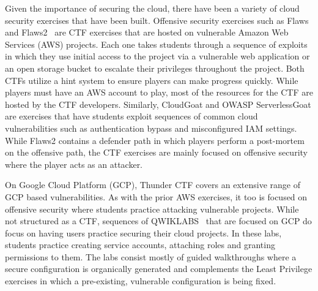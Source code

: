 Given the importance of securing the cloud, there have been a variety of cloud security exercises that have been built.
Offensive security exercises such as Flaws and Flaws2~\cite{flaws,flaws2} are CTF exercises that are hosted on vulnerable
Amazon Web Services (AWS) projects.  Each one takes students through a sequence of exploits in which they use initial access to the project
via a vulnerable web application or an open storage bucket to escalate their privileges throughout the project.  Both CTFs
utilize a hint system to ensure players can make progress quickly.  While players must have an AWS account to
play, most of the resources for the CTF are hosted by the CTF developers.   Similarly, CloudGoat \cite{cloudgoat} and OWASP ServerlessGoat \cite{serverlessgoat}
are exercises that have students exploit sequences of common cloud vulnerabilities such as authentication bypass and misconfigured IAM settings.
While Flaws2 contains a defender path in which players perform a post-mortem on the offensive path, the CTF exercises are mainly focused
on offensive security where the player acts as an attacker.

On Google Cloud Platform (GCP), Thunder CTF \cite{thunder-ctf} covers an extensive range of GCP based vulnerabilities.  As with the prior AWS exercises, it too
is focused on offensive security where students practice attacking vulnerable projects.  While not structured as a CTF, sequences of QWIKLABS~\cite{QWIKLABS} 
that are focused on GCP do focus on having users practice securing their cloud projects.  In these labs, students practice creating service accounts, attaching
roles and granting permissions to them.  The labs consist mostly of guided walkthroughs where a secure configuration is organically generated and complements
the Least Privilege exercises in which a pre-existing, vulnerable configuration is being fixed.

